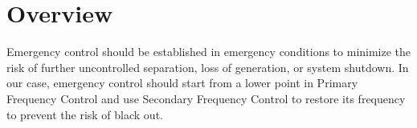 \section{Overview} %
Emergency  control should be established in emergency conditions to minimize the risk of further uncontrolled separation, loss of generation, or system shutdown. In our case, emergency control should start from a lower point in Primary Frequency Control and use Secondary Frequency Control to restore its frequency to prevent the risk of black out. 